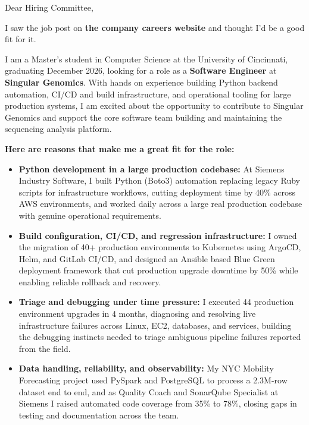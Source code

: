\documentclass[11pt]{letter}
\date{}
\begin{document}
\begin{letter}{}

\opening{Dear Hiring Committee,}

I saw the job post on \textbf{the company careers website} and thought I'd be a good fit for it.

I am a Master's student in Computer Science at the University of Cincinnati, graduating December 2026, looking for a role as a \textbf{Software Engineer} at \textbf{Singular Genomics}. With hands on experience building Python backend automation, CI/CD and build infrastructure, and operational tooling for large production systems, I am excited about the opportunity to contribute to Singular Genomics and support the core software team building and maintaining the sequencing analysis platform.

\textbf{Here are reasons that make me a great fit for the role:}

\begin{itemize}[leftmargin=*, itemsep=0.45em]
    \item \textbf{Python development in a large production codebase:} At Siemens Industry Software, I built Python (Boto3) automation replacing legacy Ruby scripts for infrastructure workflows, cutting deployment time by 40\% across AWS environments, and worked daily across a large real production codebase with genuine operational requirements.

    \item \textbf{Build configuration, CI/CD, and regression infrastructure:} I owned the migration of 40+ production environments to Kubernetes using ArgoCD, Helm, and GitLab CI/CD, and designed an Ansible based Blue Green deployment framework that cut production upgrade downtime by 50\% while enabling reliable rollback and recovery.

    \item \textbf{Triage and debugging under time pressure:} I executed 44 production environment upgrades in 4 months, diagnosing and resolving live infrastructure failures across Linux, EC2, databases, and services, building the debugging instincts needed to triage ambiguous pipeline failures reported from the field.

    \item \textbf{Data handling, reliability, and observability:} My NYC Mobility Forecasting project used PySpark and PostgreSQL to process a 2.3M-row dataset end to end, and as Quality Coach and SonarQube Specialist at Siemens I raised automated code coverage from 35\% to 78\%, closing gaps in testing and documentation across the team.


\end{itemize}
\end{letter}
\end{document}
